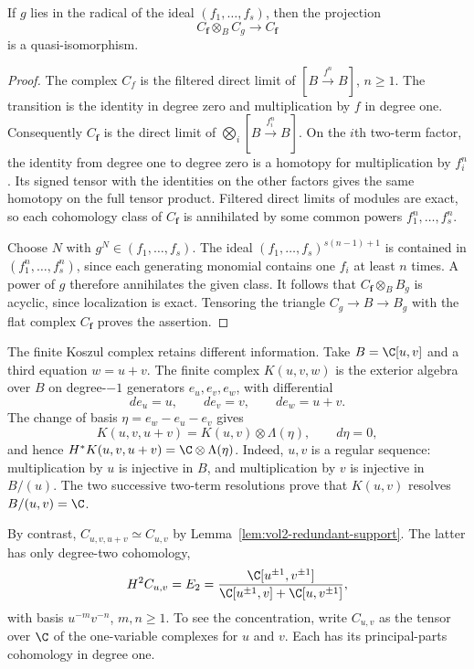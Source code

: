 \begin{lemma}\label{lem:vol2-redundant-support}
If $g$ lies in the radical of the ideal $(f_1,\ldots,f_s)$, then
the projection
\[
 C_{\mathbf f}\otimes_B C_g\longrightarrow C_{\mathbf f}
\]
is a quasi-isomorphism.
\end{lemma}

\begin{proof}
The complex $C_f$ is the filtered direct limit of
$[B\xrightarrow{f^n}B]$, $n\geq1$. The transition is the identity
in degree zero and multiplication by $f$ in degree one.
Consequently $C_{\mathbf f}$ is the direct limit of
$\bigotimes_i[B\xrightarrow{f_i^n}B]$.
On the $i$th two-term factor, the identity from degree one to
degree zero is a homotopy for multiplication by $f_i^n$.
Its signed tensor with the identities on the other factors gives
the same homotopy on the full tensor product.
Filtered direct limits of modules are exact, so each cohomology
class of $C_{\mathbf f}$ is annihilated by some common powers
$f_1^n,\ldots,f_s^n$.

Choose $N$ with $g^N\in(f_1,\ldots,f_s)$. The ideal
$(f_1,\ldots,f_s)^{s(n-1)+1}$ is contained in
$(f_1^n,\ldots,f_s^n)$, since each generating monomial contains
one $f_i$ at least $n$ times. A power of $g$ therefore annihilates
the given class. It follows that $C_{\mathbf f}\otimes_B B_g$
is acyclic, since localization is exact. Tensoring the triangle
$C_g\to B\to B_g$ with the flat complex $C_{\mathbf f}$ proves
the assertion.
\end{proof}

The finite Koszul complex retains different information. Take
$B=\C[u,v]$ and a third equation $w=u+v$. The finite complex
$K(u,v,w)$ is the exterior algebra over $B$ on degree-$-1$
generators $e_u,e_v,e_w$, with differential
\[
 de_u=u,\qquad de_v=v,\qquad de_w=u+v.
\]
The change of basis $\eta=e_w-e_u-e_v$ gives
\begin{equation}\label{eq:vol2-triangle-excess}
 K(u,v,u+v)=K(u,v)\otimes\Lambda(\eta),\qquad
 d\eta=0,
\end{equation}
and hence $H^*K(u,v,u+v)=\C\otimes\Lambda(\eta)$.
Indeed, $u,v$ is a regular sequence: multiplication by $u$ is
injective in $B$, and multiplication by $v$ is injective in $B/(u)$.
The two successive two-term resolutions prove that $K(u,v)$
resolves $B/(u,v)=\C$.

By contrast, $C_{u,v,u+v}\simeq C_{u,v}$ by
Lemma~\ref{lem:vol2-redundant-support}. The latter has only
degree-two cohomology,
\begin{equation}\label{eq:vol2-two-normal-parts}
 H^2C_{u,v}=
 E_2=\frac{\C[u^{\pm1},v^{\pm1}]}
              {\C[u^{\pm1},v]+\C[u,v^{\pm1}]},
\end{equation}
with basis $u^{-m}v^{-n}$, $m,n\geq1$.
To see the concentration, write $C_{u,v}$ as the tensor over $\C$
of the one-variable complexes for $u$ and $v$. Each has its
principal-parts cohomology in degree one.

